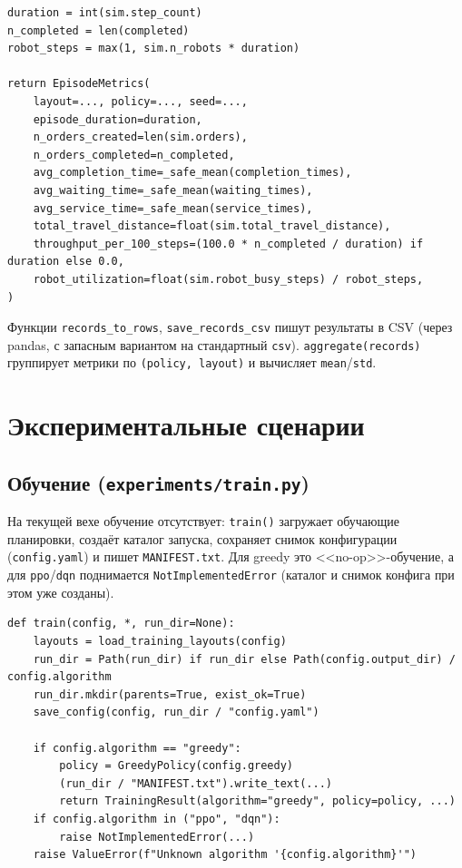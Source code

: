 \documentclass[11pt,a4paper]{article}
\newcommand{\code}[1]{\texttt{#1}}
\begin{document}
\begin{lstlisting}[style=py]
duration = int(sim.step_count)
n_completed = len(completed)
robot_steps = max(1, sim.n_robots * duration)

return EpisodeMetrics(
    layout=..., policy=..., seed=...,
    episode_duration=duration,
    n_orders_created=len(sim.orders),
    n_orders_completed=n_completed,
    avg_completion_time=_safe_mean(completion_times),
    avg_waiting_time=_safe_mean(waiting_times),
    avg_service_time=_safe_mean(service_times),
    total_travel_distance=float(sim.total_travel_distance),
    throughput_per_100_steps=(100.0 * n_completed / duration) if duration else 0.0,
    robot_utilization=float(sim.robot_busy_steps) / robot_steps,
)
\end{lstlisting}

Функции \code{records\_to\_rows}, \code{save\_records\_csv} пишут результаты в
CSV (через pandas, с запасным вариантом на стандартный \code{csv}).
\code{aggregate(records)} группирует метрики по \code{(policy, layout)} и
вычисляет \code{mean}/\code{std}.

\section{Экспериментальные сценарии}
\subsection{Обучение (\code{experiments/train.py})}
На текущей вехе обучение отсутствует: \code{train()} загружает обучающие
планировки, создаёт каталог запуска, сохраняет снимок конфигурации
(\code{config.yaml}) и пишет \code{MANIFEST.txt}. Для greedy это
<<no-op>>-обучение, а для \code{ppo}/\code{dqn} поднимается
\code{NotImplementedError} (каталог и снимок конфига при этом уже созданы).

\begin{lstlisting}[style=py]
def train(config, *, run_dir=None):
    layouts = load_training_layouts(config)
    run_dir = Path(run_dir) if run_dir else Path(config.output_dir) / config.algorithm
    run_dir.mkdir(parents=True, exist_ok=True)
    save_config(config, run_dir / "config.yaml")

    if config.algorithm == "greedy":
        policy = GreedyPolicy(config.greedy)
        (run_dir / "MANIFEST.txt").write_text(...)
        return TrainingResult(algorithm="greedy", policy=policy, ...)
    if config.algorithm in ("ppo", "dqn"):
        raise NotImplementedError(...)
    raise ValueError(f"Unknown algorithm '{config.algorithm}'")
\end{lstlisting}
\end{document}
